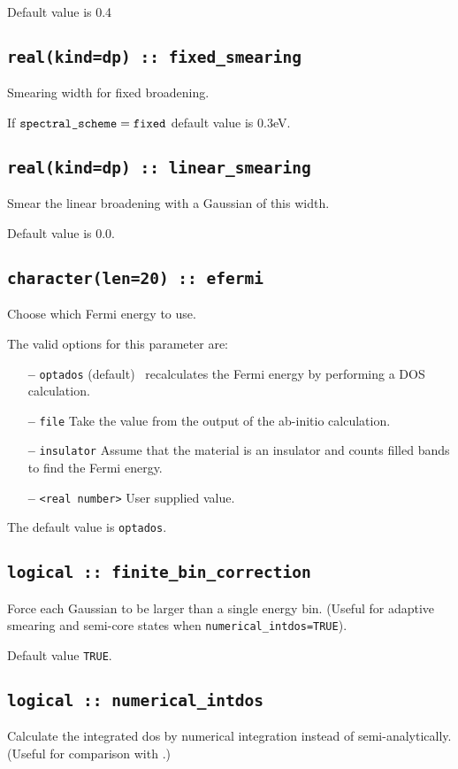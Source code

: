 \documentclass[a4paper,11pt,twoside]{book}
\begin{document}
Default value is 0.4

\subsection[fixed\_smearing]{\tt real(kind=dp) :: fixed\_smearing}
Smearing width for fixed broadening.

If $\verb#spectral_scheme# = \verb#fixed#$ default value is 0.3eV.


\subsection[adaptive\_smearing]{\tt real(kind=dp) :: linear\_smearing}
Smear the linear broadening with a Gaussian of this width.

Default value is 0.0.

\subsection[compute\_efermi]{{\tt character(len=20) :: efermi}}
Choose which Fermi energy to use.

The valid options for this parameter are:
\begin{itemize}
\item[{\bf --}]  \verb#optados# (default) \optados\ recalculates the Fermi energy by performing a DOS calculation.
\item[{\bf --}]  \verb#file# Take the value from the output of the ab-initio calculation.
\item[{\bf --}]  \verb#insulator# Assume that the material is an insulator and counts filled bands to find the Fermi energy.
\item[{\bf --}]  \verb#<real number># User supplied value.
\end{itemize}

The default value is {\tt optados}.

\subsection[finite\_bin\_correction]{\tt logical :: finite\_bin\_correction}
Force each Gaussian to be larger than a single energy bin. (Useful for adaptive smearing and semi-core states when \verb#numerical_intdos=TRUE#).

Default value \verb#TRUE#.

\subsection[numerical\_intdos]{\tt logical :: numerical\_intdos}
Calculate the integrated dos by numerical integration instead of semi-analytically. (Useful for comparison with \lindos.)
\end{document}
